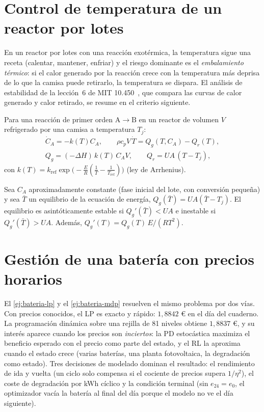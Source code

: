 \section{Control de temperatura de un reactor por lotes}

En un reactor por lotes con una reacción exotérmica, la temperatura sigue una receta (calentar, mantener, enfriar) y el riesgo dominante es el \emph{embalamiento térmico}: si el calor generado por la reacción crece con la temperatura más deprisa de lo que la camisa puede retirarlo, la temperatura se dispara. El análisis de estabilidad de la lección~6 de MIT 10.450~\cite{mit10450}, que compara las curvas de calor generado y calor retirado, se resume en el criterio siguiente.

\begin{definicion}\label{def:reactor}
Para una reacción de primer orden $\mathrm A\to\mathrm B$ en un reactor de volumen $V$ refrigerado por una camisa a temperatura $T_j$:
\[
\begin{gathered}
\dot C_A=-k(T)C_A,\qquad \rho c_pV\,\dot T=Q_g(T,C_A)-Q_r(T),\\
Q_g=(-\Delta H)\,k(T)\,C_AV,\qquad Q_r=UA\,(T-T_j),
\end{gathered}
\]
con $k(T)=k_{\mathrm{ref}}\exp\bigl(-\frac{E}{R}(\frac1T-\frac1{T_{\mathrm{ref}}})\bigr)$ (ley de Arrhenius).
\end{definicion}

\begin{proposicion}\label{prop:semenov}
Sea $C_A$ aproximadamente constante (fase inicial del lote, con conversión pequeña) y sea $\bar T$ un equilibrio de la ecuación de energía, $Q_g(\bar T)=UA(\bar T-T_j)$. El equilibrio es asintóticamente estable si $Q_g'(\bar T)<UA$ e inestable si $Q_g'(\bar T)>UA$. Además, $Q_g'(T)=Q_g(T)\,E/(RT^{2})$.
\end{proposicion}

\addtocounter{definicion}{1}%

\section{Gestión de una batería con precios horarios}

El \cref{ej:bateria-lp} y el \cref{ej:bateria-mdp} resuelven el mismo problema por dos vías. Con precios conocidos, el LP es exacto y rápido: $1{,}8842$ € en el día del cuaderno. La programación dinámica sobre una rejilla de 81 niveles obtiene $1{,}8837$ €, y su interés aparece cuando los precios son \emph{inciertos}: la PD estocástica maximiza el beneficio esperado con el precio como parte del estado, y el RL la aproxima cuando el estado crece (varias baterías, una planta fotovoltaica, la degradación como estado). Tres decisiones de modelado dominan el resultado: el rendimiento de ida y vuelta (un ciclo solo compensa si el cociente de precios supera $1/\eta^{2}$), el coste de degradación por kWh cíclico y la condición terminal (sin $e_{24}=e_0$, el optimizador vacía la batería al final del día porque el modelo no ve el día siguiente).

